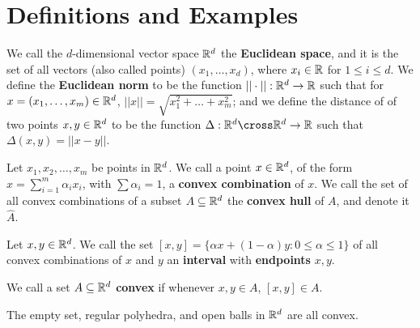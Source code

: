 
\section{Definitions and Examples}

\begin{definition}
    We call the $d$-dimensional vector space  $\mathbb{R}^d$ the  \textbf{Euclidean space}, and it is 
    the set of all vectors (also called points) $(x_1, \dots, x_d)$, where $x_i \in \mathbb{R}$ 
    for  $1 \leq i \leq d$. We define the \textbf{Euclidean norm} to be the function 
    $||\cdot||: \mathbb{R}^d \rightarrow \mathbb{R}$ such that for $x=(x_1, \dots, x_m) \in \mathbb{R}^d$, $||x||=\sqrt{x_1^2+\dots+x_m^2}$; 
    and we define the distance of of two points $x,y \in \mathbb{R}^d$ to be the function 
    $\Delta: \R^d \cross \R^d \rightarrow \R$ such that $\Delta(x,y)=||x-y||$.
\end{definition}

\begin{definition}
    Let $x_1,x_2, \dots, x_m$ be points in $\mathbb{R}^d$. We call a point  $x \in \mathbb{R}^d$, of the form 
   $x=\sum_{i=1}^{m}{\alpha_ix_i}$, with  $\sum{\alpha_i}=1$, a \textbf{convex combination} of $x$. We 
   call the set of all convex combinations of a subset  $A \subseteq \mathbb{R}^d$ the 
   \textbf{convex hull} of $A$, and denote it  $\hat{A}$.
\end{definition}

\begin{definition}
    Let $x,y  \in \mathbb{R}^d$. We call the set  $[x,y]=\{\alpha x+(1-\alpha)y: 0 \leq \alpha \leq 1\}$ of all 
    convex combinations of $x$ and  $y$ an \textbf{interval} with \textbf{endpoints}  $x, y$.

    We call a set  $A \subseteq \mathbb{R}^d$ \textbf{convex} if  whenever $x,y \in A$,  $[x,y] \in A$.
\end{definition}

\begin{example}
   The empty set, regular polyhedra, and open balls in $\mathbb{R}^d$ are all convex. 		
\end{example} 

